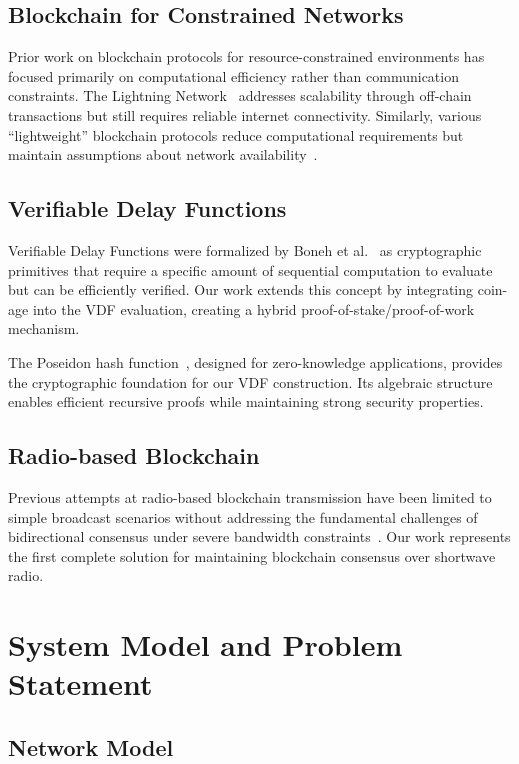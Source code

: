 \documentclass[11pt,a4paper]{article}
\begin{document}
\subsection{Blockchain for Constrained Networks}

Prior work on blockchain protocols for resource-constrained environments has focused primarily on computational efficiency rather than communication constraints. The Lightning Network~\cite{lightning} addresses scalability through off-chain transactions but still requires reliable internet connectivity. Similarly, various ``lightweight'' blockchain protocols reduce computational requirements but maintain assumptions about network availability~\cite{kiayias2017ouroboros}.

\subsection{Verifiable Delay Functions}

Verifiable Delay Functions were formalized by Boneh et al.~\cite{boneh2018verifiable} as cryptographic primitives that require a specific amount of sequential computation to evaluate but can be efficiently verified. Our work extends this concept by integrating coin-age into the VDF evaluation, creating a hybrid proof-of-stake/proof-of-work mechanism.

The Poseidon hash function~\cite{grassi2021poseidon}, designed for zero-knowledge applications, provides the cryptographic foundation for our VDF construction. Its algebraic structure enables efficient recursive proofs while maintaining strong security properties.

\subsection{Radio-based Blockchain}

Previous attempts at radio-based blockchain transmission have been limited to simple broadcast scenarios without addressing the fundamental challenges of bidirectional consensus under severe bandwidth constraints~\cite{radio_bitcoin}. Our work represents the first complete solution for maintaining blockchain consensus over shortwave radio.

\section{System Model and Problem Statement}

\subsection{Network Model}
\end{document}
